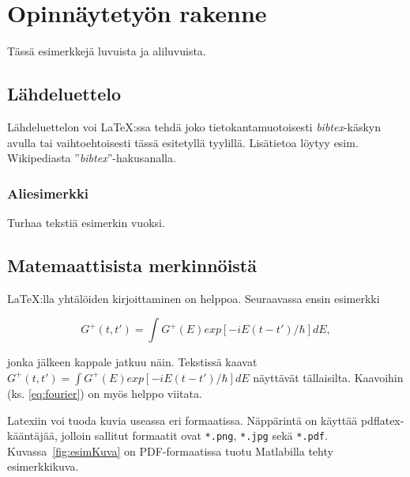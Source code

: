\chapter{Opinnäytetyön rakenne}

Tässä esimerkkejä luvuista ja aliluvuista.

\section{Lähdeluettelo}

Lähdeluettelon voi \LaTeX:ssa tehdä joko tietokantamuotoisesti
\textit{bibtex}-käskyn avulla tai vaihtoehtoisesti tässä esitetyllä tyylillä.
Lisätietoa löytyy esim. Wikipediasta ''\textit{bibtex}''-hakusanalla.

%
%

\subsection{Aliesimerkki}

Turhaa tekstiä esimerkin vuoksi.

\section{Matemaattisista merkinnöistä}

\LaTeX:lla yhtälöiden kirjoittaminen on helppoa. Seuraavassa ensin esimerkki 

\begin{equation}
  \label{eq:fourier}
  G^+(t,t')= \int G^+(E) exp[-iE(t-t')/\hbar] dE,
\end{equation}

jonka jälkeen kappale jatkuu näin.
Tekstissä kaavat $G^+(t,t')= \int G^+(E) exp[-iE(t-t')/\hbar] dE$ näyttävät
tällaisilta. Kaavoihin (ks. \ref{eq:fourier}) on myös helppo viitata.

%


Latexiin voi tuoda kuvia useassa eri formaatissa.
Näppärintä on käyttää pdflatex-kääntäjää, jolloin
sallitut formaatit ovat \verb+*.png+, \verb+*.jpg+
sekä \verb+*.pdf+. Kuvassa~\ref{fig:esimKuva} on
PDF-formaatissa tuotu Matlabilla tehty
esimerkkikuva.
